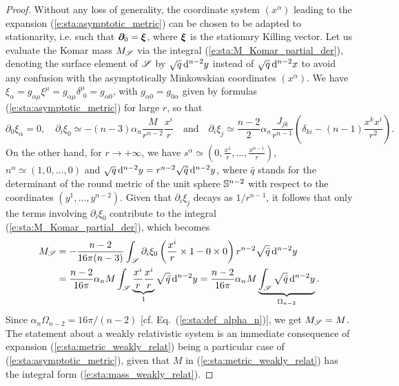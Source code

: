 \begin{proof}
Without any loss of generality, the coordinate system $(x^\alpha)$ leading
to the expansion (\ref{e:sta:asymptotic_metric}) can be chosen to be adapted
to stationarity, i.e. such that  $\bm{\partial}_0 = \bm{\xi}$, where $\bm{\xi}$ is the
stationary Killing vector.
Let us evaluate the Komar mass $M_{\mathscr{S}}$
via the integral (\ref{e:sta:M_Komar_partial_der}),
denoting the surface element of $\mathscr{S}$ by $\sqrt{q} \, \mathrm{d}^{n-2} y$
instead of $\sqrt{q} \, \mathrm{d}^{n-2} x$  to avoid any
confusion with the asymptotically Minkowskian coordinates $(x^\alpha)$.
We have $\xi_\alpha = g_{\alpha\mu} \xi^\mu = g_{\alpha\mu} \delta^\mu_{\ \, 0} =  g_{\alpha 0}$,
with $g_{\alpha 0} = g_{0\alpha}$ given by formulas (\ref{e:sta:asymptotic_metric}) for large $r$,
so that
\[
    \partial_0 \xi_\alpha = 0, \quad
    \partial_i \xi_0 \simeq - (n-3)\alpha_n\frac{M}{r^{n-2}} \frac{x^i}{r }
    \quad \mbox{and} \quad
    \partial_i \xi_j \simeq \frac{n-2}{2}\alpha_n \frac{J_{jk}}{r^{n-1}}
    \left( \delta_{ki} - (n-1) \frac{x^k x^i}{r^2} \right) .
\]
On the other hand, for $r\to +\infty$, we have
$s^\alpha \simeq \left(0,\frac{x^1}{r}, \ldots,\frac{x^{n-1}}{r} \right)$,
$n^\alpha \simeq (1, 0, \ldots, 0)$ and $\sqrt{q} \, \mathrm{d}^{n-2}y = r^{n-2} \sqrt{\bar{q}} \, \mathrm{d}^{n-2} y$,
where $\bar{q}$ stands for the determinant of the round metric of the unit sphere $\mathbb{S}^{n-2}$ with
respect to the coordinates $(y^1,\ldots,y^{n-2})$. Given that $\partial_i \xi_j$ decays as $1/r^{n-1}$,
it follows that only the terms
involving $\partial_i \xi_0$ contribute to the integral (\ref{e:sta:M_Komar_partial_der}), which becomes
\begin{align}
    M_{\mathscr{S}} & = -\frac{n-2}{16\pi(n-3)}
    \int_{\mathscr{S}} \partial_i \xi_0 \left( \frac{x^i}{r} \times 1 - 0\times 0 \right) r^{n-2} \sqrt{\bar{q}} \, \mathrm{d}^{n-2} y \nonumber \\
    & = \frac{n-2}{16\pi} \alpha_n M \int_{\mathscr{S}} \underbrace{\frac{x^i}{r} \frac{x^i}{r}}_{1}
     \sqrt{\bar{q}} \, \mathrm{d}^{n-2} y
      = \frac{n-2}{16\pi} \alpha_n M  \underbrace{ \int_{\mathscr{S}} \sqrt{\bar{q}} \, \mathrm{d}^{n-2} y }_{\Omega_{n-2}} .
       \nonumber
\end{align}
Since $\alpha_n\Omega_{n-2} = 16\pi/(n-2)$ [cf. Eq.~(\ref{e:sta:def_alpha_n})],
we get $M_{\mathscr{S}} = M$. The statement about a weakly relativistic system is an immediate consequence
of expansion (\ref{e:sta:metric_weakly_relat}) being a particular case of
(\ref{e:sta:asymptotic_metric}), given that $M$ in (\ref{e:sta:metric_weakly_relat}) has
the integral form (\ref{e:sta:mass_weakly_relat}).
\end{proof}


